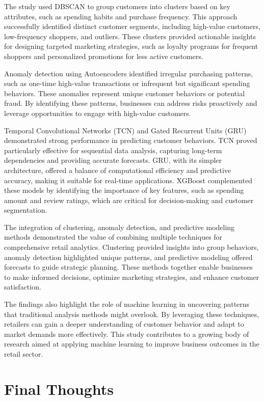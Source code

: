 \documentclass[12pt, a4paper,twoside]{report}
\theoremstyle{plain} %
\theoremstyle{definition} %
\theoremstyle{remark} %
\numberwithin{equation}{chapter}
\begin{document}
The study used DBSCAN to group customers into clusters based on key attributes, such as spending habits and purchase frequency. This approach successfully identified distinct customer segments, including high-value customers, low-frequency shoppers, and outliers. These clusters provided actionable insights for designing targeted marketing strategies, such as loyalty programs for frequent shoppers and personalized promotions for less active customers.

Anomaly detection using Autoencoders identified irregular purchasing patterns, such as one-time high-value transactions or infrequent but significant spending behaviors. These anomalies represent unique customer behaviors or potential fraud. By identifying these patterns, businesses can address risks proactively and leverage opportunities to engage with high-value customers.

Temporal Convolutional Networks (TCN) and Gated Recurrent Units (GRU) demonstrated strong performance in predicting customer behaviors. TCN proved particularly effective for sequential data analysis, capturing long-term dependencies and providing accurate forecasts. GRU, with its simpler architecture, offered a balance of computational efficiency and predictive accuracy, making it suitable for real-time applications. XGBoost complemented these models by identifying the importance of key features, such as spending amount and review ratings, which are critical for decision-making and customer segmentation.

The integration of clustering, anomaly detection, and predictive modeling methods demonstrated the value of combining multiple techniques for comprehensive retail analytics. Clustering provided insights into group behaviors, anomaly detection highlighted unique patterns, and predictive modeling offered forecasts to guide strategic planning. These methods together enable businesses to make informed decisions, optimize marketing strategies, and enhance customer satisfaction.

The findings also highlight the role of machine learning in uncovering patterns that traditional analysis methods might overlook. By leveraging these techniques, retailers can gain a deeper understanding of customer behavior and adapt to market demands more effectively. This study contributes to a growing body of research aimed at applying machine learning to improve business outcomes in the retail sector.

\section{Final Thoughts}
\end{document}
